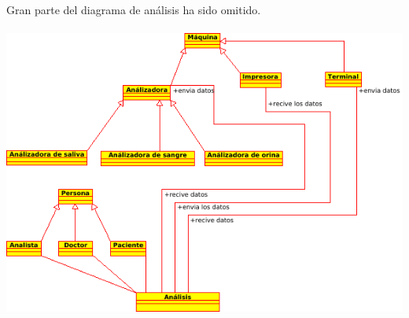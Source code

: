 \documentclass[a4paper,10pt]{article}
\begin{document}
\paragraph{}
Gran parte del diagrama de análisis ha sido omitido.\\
\vspace{0.7cm}\\
\includegraphics[width=\textwidth]{img/all.png}




\end{document}
